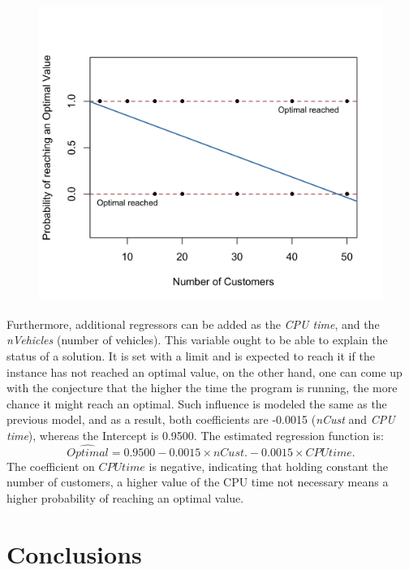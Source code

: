 \documentclass[5p,times]{elsarticle}
\begin{document}
			\begin{figure}
				\begin{center}
					\includegraphics[scale=0.09]{fig/pred}
					\label{fig:lm}
				\end{center}
			\end{figure}
		
		Furthermore, additional regressors can be added as the \textit{CPU time}, and the \textit{nVehicles} (number of vehicles). This variable ought to be able to explain the status of a solution. It is set with a limit and is expected to reach it if the instance has not reached an optimal value, on the other hand, one can come up with the conjecture that the higher the time the program is running, the more chance it might reach an optimal. Such influence is modeled the same as the previous model, and as a result, both coefficients are -0.0015 (\textit{nCust} and \textit{CPU time}), whereas the Intercept is 0.9500. The estimated regression function is: \begin{equation}
			\widehat{Optimal} = 0.9500 - 0.0015 \times nCust. - 0.0015 \times CPU time.
		\end{equation} The coefficient on $ CPU time $ is negative, indicating that holding constant the number of customers, a higher value of the CPU time not necessary means a higher probability of reaching an optimal value.
 
\section{Conclusions} \label{Section6}
	
\end{document}
